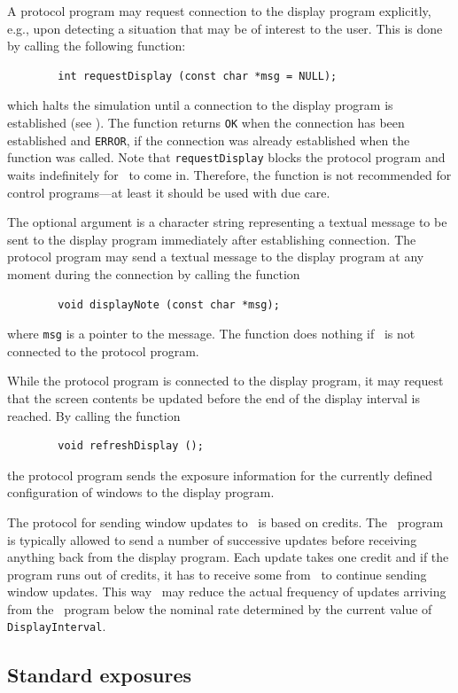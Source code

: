 A protocol program may request connection to the display program explicitly,
e.g., upon detecting a situation that may be of interest to the
user.
This is done by calling the following function:
\begin{verbatim}
        int requestDisplay (const char *msg = NULL);
\end{verbatim}
which halts the simulation until a connection to the display program is
established (see ).
The function returns {\tt OK} when the connection has been established and
{\tt ERROR}, if the connection was already established when the function
was called.
Note that {\tt requestDisplay} blocks the protocol program and
waits indefinitely for \dsd\ to come in.
Therefore, the function is not recommended for control programs---at least
it should be used with due care.

The optional argument is a character string representing a textual message
to be sent to the display program immediately after establishing connection.
The protocol program may send a textual message to the display 
program at any moment during the connection by calling the function
\begin{verbatim}
        void displayNote (const char *msg);
\end{verbatim}
where {\tt msg} is a pointer to the message.
The function does nothing if \dsd\ is not connected to the protocol
program.

While the protocol program is connected to the display program, it
may request that the screen contents be updated before the
end of the display interval is reached.
By calling the function
\begin{verbatim}
        void refreshDisplay ();
\end{verbatim}
the protocol program sends the exposure information for the currently defined
configuration of windows to the display program.

The protocol for sending window updates to \dsd\ is based on credits.
The \smurph\ program is typically allowed to send a number of successive
updates before receiving anything back from the display program.
Each update takes one credit and if the program runs out of credits, it has
to receive some from \dsd\ to continue sending window updates.
This way \dsd\ may reduce the actual frequency of updates arriving from the
\smurph\ program below the nominal rate determined by the current
value of {\tt DisplayInterval}.

\subsection{Standard exposures}
\label{rm_ex_se}

